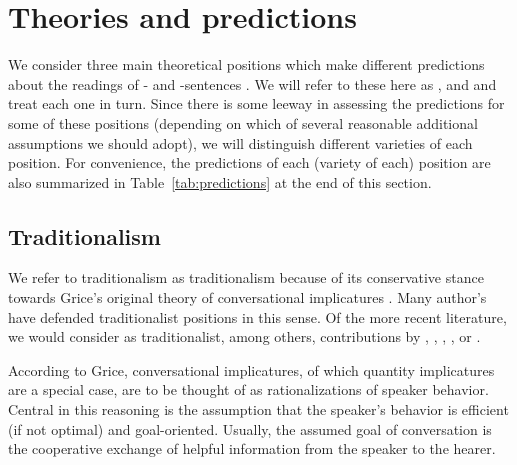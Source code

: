 \documentclass[fleqn,reqno,10pt,draft]{article}
\newcommand{\as}{\acro{as}}
\renewcommand{\es}{\acro{es}}
\begin{document}
\section{Theories and predictions}
\label{sec:theories-predictions}

We consider three main theoretical positions which make different
predictions about the readings of \as- and \es-sentences
\citep[c.f.][for
overview]{Horn2006:The-Border-Wars,Geurts2010:Quantity-Implic,Sauerland2012:The-Computation}. We
will refer to these here as ,
 and  and treat each
one in turn. Since there is some leeway in assessing the predictions
for some of these positions (depending on which of several reasonable
additional assumptions we should adopt), we will distinguish different
varieties of each position. For convenience, the predictions of each
(variety of each) position are also summarized in
Table~\ref{tab:predictions} at the end of this section.

\subsection{Traditionalism}
\label{sec:traditionalism}

We refer to traditionalism as traditionalism because of its
conservative stance towards Grice's original theory of conversational
implicatures \citep{Grice1975:Logic-and-Conve}. Many author's have
defended traditionalist positions in this sense. Of the more recent
literature, we would consider as traditionalist, among others,
contributions by \citet{Spector2006:Scalar-Implicat},
\citet{Sauerland2004:Scalar-Implicat},
\citet{Russell2006:Against-Grammat},
\citet{vanRooijSchulz:ExhaustiveInterpretation},
\citet{Geurts2010:Quantity-Implic} or
\citet{Franke2011:Quantity-Implic}.

According to Grice, conversational implicatures, of which quantity
implicatures are a special case, are to be thought of as
rationalizations of speaker behavior. Central in this reasoning is the
assumption that the speaker's behavior is efficient (if not optimal)
and goal-oriented. Usually, the assumed goal of conversation is the
cooperative exchange of helpful information from the speaker to the
hearer.
\end{document}
